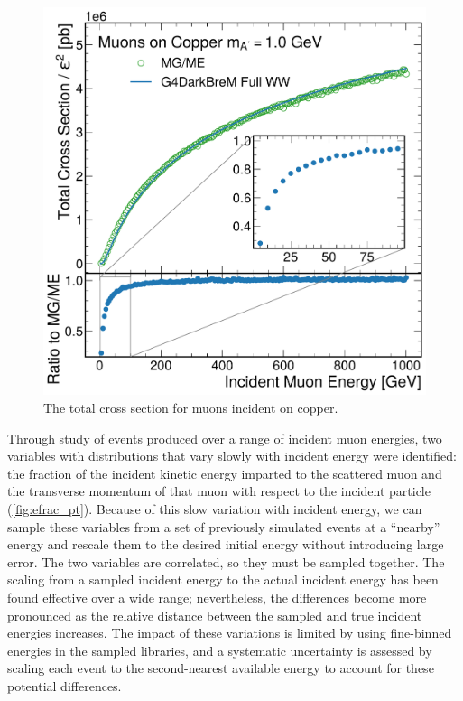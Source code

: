 \begin{figure}[!htbp]
    \centering
    \includegraphics[width=\textwidth]{figures/mu_xsec.pdf}
    \caption[
        The \dbrem cross section.
    ]{
        The total \dbrem cross section for muons incident on copper. 
    }
    \label{fig:mu_xsec}
\end{figure}

Through study of \mg events produced over a range of incident muon energies, two variables with distributions that vary slowly with incident energy were identified: the fraction of the incident kinetic energy imparted to the scattered muon and the transverse momentum of that muon with respect to the incident particle (\cref{fig:efrac_pt}). 
Because of this slow variation with incident energy, we can sample these variables from a set of previously simulated \mg events at a ``nearby'' energy and rescale them to the desired initial energy without introducing large error. 
The two variables are correlated, so they must be sampled together. 
The scaling from a sampled \mg incident energy to the actual \gf incident energy has been found effective over a wide range; nevertheless, the differences become more pronounced as the relative distance between the sampled and true incident energies increases.
The impact of these variations is limited by using fine-binned energies in the sampled \mg libraries, and a systematic uncertainty is assessed by scaling each event to the second-nearest available energy to account for these potential differences. 

